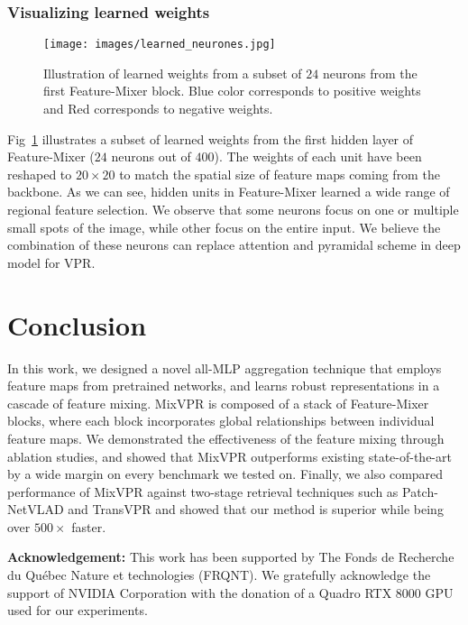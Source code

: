 \documentclass[10pt,twocolumn,letterpaper]{article}
\begin{document}
\subsubsection{Visualizing learned weights}
\begin{figure}
\begin{center}
\texttt{[image: images/learned\_neurones.jpg]}
\end{center}
   \caption{Illustration of learned weights from a subset of $24$ neurons from the first Feature-Mixer block. Blue color corresponds to positive weights and Red corresponds to negative weights.}
\label{fig:neurones}
\end{figure}
Fig~\ref{fig:neurones} illustrates a subset of learned weights from the first hidden layer of Feature-Mixer ($24$ neurons out of $400$). The weights of each unit have been reshaped to $20 \times 20$ to match the spatial size of feature maps coming from the backbone. As we can see, hidden units in Feature-Mixer learned a wide range of regional feature selection. We observe that some neurons focus on one or multiple small spots of the image, while other focus on the entire input. We believe the combination of these neurons can replace attention and pyramidal scheme in deep model for VPR. 





\section{Conclusion}
In this work, we designed a novel all-MLP aggregation technique that employs feature maps from pretrained networks, and learns robust representations in a cascade of feature mixing. MixVPR is composed of a stack of Feature-Mixer blocks, where each block incorporates global relationships between individual feature maps. We demonstrated the effectiveness of the feature mixing through ablation studies, and showed that MixVPR outperforms existing state-of-the-art by a wide margin on every benchmark we tested on. Finally, we also compared performance of MixVPR against two-stage retrieval techniques such as Patch-NetVLAD and TransVPR and showed that our method is superior while being over $500\times$ faster.

\vspace{5pt}
\noindent\textbf{Acknowledgement:} This work has been supported by The Fonds de Recherche du Québec Nature et technologies (FRQNT). We gratefully acknowledge the support of NVIDIA Corporation with the donation of a Quadro RTX 8000 GPU used for our experiments.

{\small


}
\end{document}
